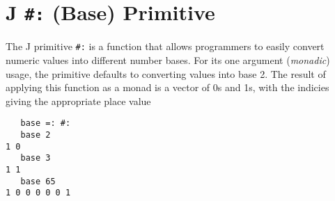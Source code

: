 \chapter{J \texttt{\#:} (Base) Primitive}
\label{base}

The J primitive \texttt{\#:} is a function that allows 
programmers to easily convert numeric values into different number bases. 
For its one argument (\textit{monadic}) usage, 
the primitive defaults to converting values into base 2. 
The result of applying this function as a monad 
is a vector of 0s and 1s, with the indicies giving the appropriate place value

\begin{singlespacing}
\begin{small}
\begin{verbatim}
   base =: #:
   base 2
1 0
   base 3
1 1
   base 65
1 0 0 0 0 0 1
\end{verbatim}
\end{small}
\end{singlespacing}
